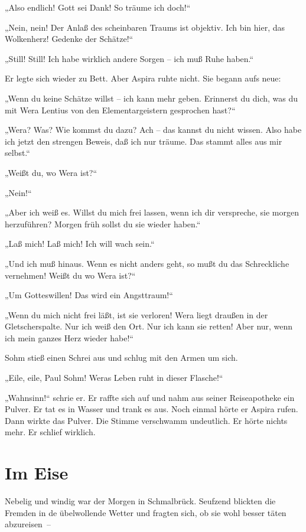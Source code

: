 „Also endlich! Gott sei Dank! So träume ich doch!“

„Nein, nein! Der Anlaß des scheinbaren Traums ist objektiv. Ich bin
hier, das Wolkenherz! Gedenke der Schätze!“

„Still! Still! Ich habe wirklich andere Sorgen – ich muß Ruhe
haben.“

Er legte sich wieder zu Bett. Aber Aspira ruhte nicht. Sie begann
aufs neue:

„Wenn du keine Schätze willst – ich kann mehr geben. Erinnerst du
dich, was du mit Wera Lentius von den Elementargeistern gesprochen
hast?“

„Wera? Was? Wie kommst du dazu? Ach – das kannst du nicht wissen.
Also habe ich jetzt den strengen Beweis, daß ich nur träume. Das
stammt alles aus mir selbst.“

„Weißt du, wo Wera ist?“

„Nein!“

„Aber ich weiß es. Willst du mich frei lassen, wenn ich dir
verspreche, sie morgen herzuführen? Morgen früh sollst du sie
wieder haben.“

„Laß mich! Laß mich! Ich will wach sein.“

„Und ich muß hinaus. Wenn es nicht anders geht, so mußt du das
Schreckliche vernehmen! Weißt du wo Wera ist?“

„Um Gotteswillen! Das wird ein Angsttraum!“

„Wenn du mich nicht frei läßt, ist sie verloren! Wera liegt draußen
in der Gletscherspalte. Nur ich weiß den Ort. Nur ich kann sie
retten! Aber nur, wenn ich mein ganzes Herz wieder habe!“

Sohm stieß einen Schrei aus und schlug mit den Armen um sich.

„Eile, eile, Paul Sohm! Weras Leben ruht in dieser Flasche!“

„Wahnsinn!“ schrie er. Er raffte sich auf und nahm aus seiner
Reiseapotheke ein Pulver. Er tat es in Wasser und trank es aus.
Noch einmal hörte er Aspira rufen. Dann wirkte das Pulver. Die
Stimme verschwamm undeutlich. Er hörte nichts mehr. Er schlief
wirklich.

\section{Im Eise}

Nebelig und windig war der Morgen in Schmalbrück. Seufzend blickten
die Fremden in de übelwollende Wetter und fragten sich, ob sie wohl
besser täten abzureisen~–

